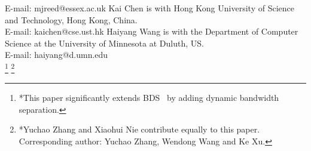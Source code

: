 \documentclass[10pt,journal,compsoc]{IEEEtran}
\begin{document}
{{E-mail: mjreed@essex.ac.uk
\IEEEcompsocthanksitem Kai Chen is with Hong Kong University of Science and Technology, Hong Kong, China.\protect\\
E-mail: kaichen@cse.ust.hk
\IEEEcompsocthanksitem Haiyang Wang is with the Department of Computer Science at the University of Minnesota at Duluth, US.\protect\\
E-mail: haiyang@d.umn.edu
}%
\protect\\
\thanks{*This paper significantly extends BDS~\cite{zhang2018bds} by adding dynamic bandwidth separation.}
\thanks{*Yuchao Zhang and Xiaohui Nie contribute equally to this paper. Corresponding author: Yuchao Zhang, Wendong Wang and Ke Xu.}
}


\maketitle


%


%
%


%
%
%


%
%
%





%

%
%

%
%
%

%


%
%

\end{document}
